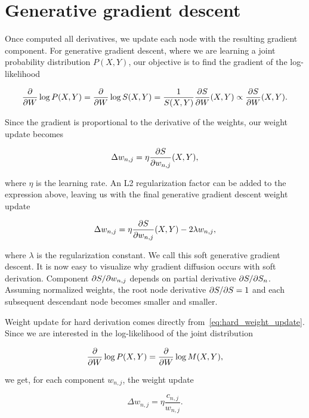\section{Generative gradient descent}

Once computed all derivatives, we update each node with the resulting gradient component. For
generative gradient descent, where we are learning a joint probability distribution $P(X,Y)$, our
objective is to find the gradient of the log-likelihood

\begin{equation*}
  \frac{\partial}{\partial W}\log P(X,Y)=\frac{\partial}{\partial W}\log S(X,Y)=\frac{1}{S(X,Y)}\frac{\partial S}{\partial W}(X,Y)\propto
    \frac{\partial S}{\partial W}(X,Y).
\end{equation*}

Since the gradient is proportional to the derivative of the weights, our weight update becomes

\begin{equation*}
  \Delta w_{n,j}=\eta\frac{\partial S}{\partial w_{n,j}}(X, Y),
\end{equation*}

where $\eta$ is the learning rate. An L2 regularization factor can be added to the expression
above, leaving us with the final generative gradient descent weight update

\begin{equation}\label{eq:gen_weight_update}
  \Delta w_{n,j}=\eta\frac{\partial S}{\partial w_{n,j}}(X, Y)-2\lambda w_{n,j},
\end{equation}

where $\lambda$ is the regularization constant. We call this soft generative gradient descent. It
is now easy to visualize why gradient diffusion occurs with soft derivation. Component
$\partial S/\partial w_{n,j}$ depends on partial derivative $\partial S/\partial S_n$. Assuming normalized weights,
the root node derivative $\partial S/\partial S=1$ and each subsequent descendant node becomes smaller and
smaller.

Weight update for hard derivation comes directly from~\autoref{eq:hard_weight_update}. Since we are
interested in the log-likelihood of the joint distribution

\begin{equation*}
  \frac{\partial}{\partial W}\log P(X,Y)=\frac{\partial}{\partial W}\log M(X,Y),
\end{equation*}

we get, for each component $w_{n,j}$, the weight update

\begin{equation*}
  \Delta w_{n,j}=\eta\frac{c_{n,j}}{w_{n,j}}.
\end{equation*}


